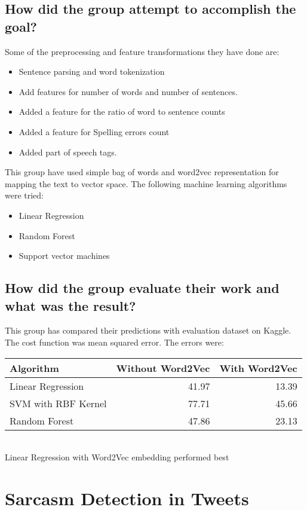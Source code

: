 \documentclass[letterpaper]{article}
\begin{document}
\subsection{How did the group attempt to accomplish the goal?}
Some of the preprocessing and feature transformations they have done are:
\begin{itemize}
	\item Sentence parsing and word tokenization
	\item Add features for number of words and number of sentences.
	\item Added a feature for the ratio of word to sentence counts
	\item Added a feature for Spelling errors count
	\item Added part of speech tags.
\end{itemize} 

This group have used simple bag of words and word2vec representation for mapping the text to vector space.
The following machine learning algorithms were tried:
\begin{itemize}
	\item Linear Regression
		\item Random Forest
	\item Support vector machines
\end{itemize} 

\subsection{How did the group evaluate their work and what was the result?}
This group has compared their predictions with evaluation dataset on Kaggle. The cost function was mean squared error. The errors were:

\begin{tabular}{| l | r | r |} \hline
	Algorithm & Without Word2Vec & With Word2Vec \\ \hline
	Linear Regression & 41.97 & 13.39 \\
	SVM with RBF Kernel & 77.71 & 45.66 \\
	Random Forest & 47.86 & 23.13  \\ \hline
\end{tabular} \\

Linear Regression with Word2Vec embedding performed best


\section{Sarcasm Detection in Tweets}
\end{document}
